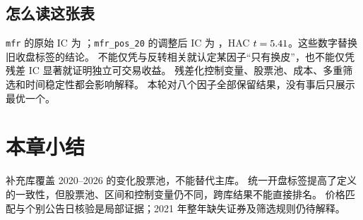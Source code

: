 \subsection{怎么读这张表}
\texttt{mfr} 的原始 IC 为 \AuditFlowMfr{}；\texttt{mfr\_pos\_20} 的调整后 IC 为
\AuditFlowPos{}，HAC $t=5.41$。这些数字替换旧收盘标签的结论。
不能仅凭与反转相关就认定某因子“只有换皮”，也不能仅凭残差 IC 显著就证明独立可交易收益。
残差化控制变量、股票池、成本、多重筛选和时间稳定性都会影响解释。
本轮对八个因子全部保留结果，没有事后只展示最优一个。

\section{本章小结}
补充库覆盖 2020--2026 的变化股票池，不能替代主库。
统一开盘标签提高了定义的一致性，但股票池、区间和控制变量仍不同，跨库结果不能直接排名。
价格匹配与个别公告日核验是局部证据；2021 年整年缺失证券及筛选规则仍待解释。
